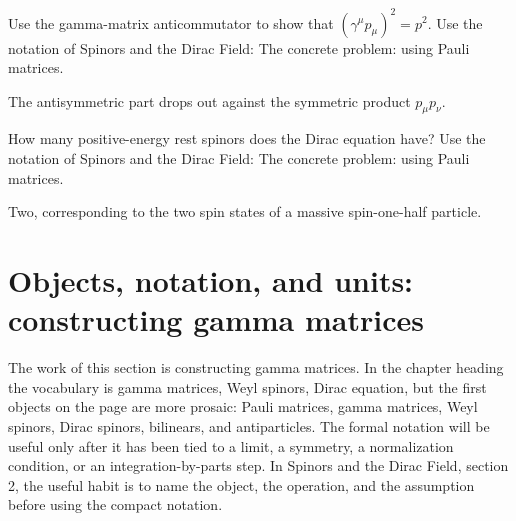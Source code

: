 \begin{exercise}
Use the gamma-matrix anticommutator to show that \((\gamma^\mu p_\mu)^2=p^2\).  Use the notation of Spinors and the Dirac Field: The concrete problem: using Pauli matrices.
\begin{answer}
The antisymmetric part drops out against the symmetric product \(p_\mu p_\nu\).
\end{answer}
\end{exercise}

\begin{exercise}
How many positive-energy rest spinors does the Dirac equation have?  Use the notation of Spinors and the Dirac Field: The concrete problem: using Pauli matrices.
\begin{answer}
Two, corresponding to the two spin states of a massive spin-one-half particle.
\end{answer}
\end{exercise}



\section{Objects, notation, and units: constructing gamma matrices}













The work of this section is constructing gamma matrices.  In the chapter heading the vocabulary is gamma matrices, Weyl spinors, Dirac equation, but the first objects on the page are more prosaic: Pauli matrices, gamma matrices, Weyl spinors, Dirac spinors, bilinears, and antiparticles.  The formal notation will be useful only after it has been tied to a limit, a symmetry, a normalization condition, or an integration-by-parts step.  In Spinors and the Dirac Field, section 2, the useful habit is to name the object, the operation, and the assumption before using the compact notation.

